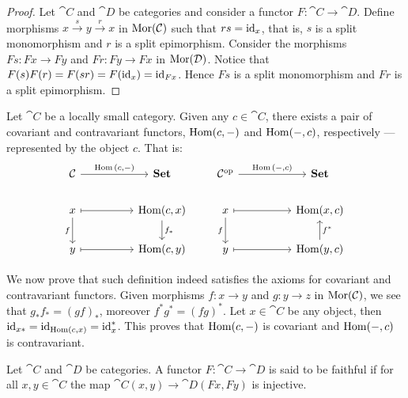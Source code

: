 \begin{proof}
Let \(\cat C\) and \(\cat D\) be categories and consider a functor \(F: \cat C
\to \cat D\). Define morphisms \(x \xrightarrow s y \xrightarrow r x\) in
\(\operatorname{Mor}(\mathcal C)\) such that \(r s = \operatorname{id}_x\), that is, \(s\) is a split
monomorphism and \(r\) is a split epimorphism. Consider the morphisms \(F s: F
x \to F y\) and \(F r: F y \to F x\) in \(\operatorname{Mor}(\mathcal D)\). Notice that \(F (s)
F(r) = F(s r) = F(\operatorname{id}_x) = \operatorname{id}_{F x}\). Hence \(F s\) is a split monomorphism
and \(F r\) is a split epimorphism.
\end{proof}

\begin{definition}\label{def:hom-functors}
Let \(\cat C\) be a locally small category. Given any \(c \in \cat C\), there
exists a pair of covariant and contravariant functors, \(\operatorname{Hom}(c, -)\) and
\(\operatorname{Hom}(-, c)\), respectively --- represented by the object \(c\). That is:
\[
  \begin{tikzcd}
    \cat C \ar[rr, "\Hom{(c, -)}"] & & \Set
    \\
    x \ar[rr, maps to] \ar[d, swap, "f"]
    & & \Hom(c, x) \ar[d, "f_*"]
    \\
    y \ar[rr, maps to] & & \Hom(c, y)
  \end{tikzcd}
  \qquad
  \begin{tikzcd}
    \cat C^\op \ar[rr, "\Hom{(-, c)}"] & & \Set
    \\
    x \ar[rr, maps to] \ar[d, swap, "f"]
    & & \Hom(x, c)
    \\
    y \ar[rr, maps to] & & \cat \Hom(y, c) \ar[u, swap, "f^*"]
  \end{tikzcd}
\]
\end{definition}

We now prove that such definition indeed satisfies the axioms for covariant and
contravariant functors. Given morphisms \(f: x \to y\) and \(g: y \to z\) in
\(\operatorname{Mor}(\mathcal C)\), we see that \(g_* f_* = (g f)_*\), moreover \(f^* g^* = (f
g)^*\). Let \(x \in \cat C\) be any object, then \(\operatorname{id}_{x *} = \operatorname{id}_{\operatorname{Hom}(c, x)}
= \operatorname{id}_x^*\). This proves that \(\operatorname{Hom}(c, -)\) is covariant and \(\operatorname{Hom}(-, c)\) is
contravariant.

\begin{definition}[Faithful]\label{def: faithful}
Let \(\cat C\) and \(\cat D\) be categories. A functor \(F: \cat C \to \cat D\)
is said to be faithful if for all \(x, y \in \cat C\) the map \(\cat C(x, y) \to
\cat D(F x, F y)\) is injective.
\end{definition}

